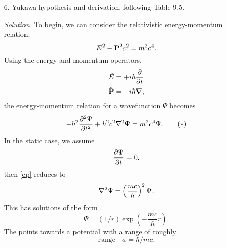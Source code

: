 \documentclass{homework}
\newcommand{\solution}{	\vspace{1em} \textit{Solution.} \quad }
\begin{document}
\begin{enumerate}
			\solution 
			$$
				\begin{array}{clcc}
					\toprule
					L & \text{State} & J & \text{Exchange Sym.} \\
					\midrule
					\multirow{2}{*}{$L=0$} & \ce{^1 S_0} & 0^+ & a \\
						& \ce{^3 S_1} & 1^+ & s \\
					\midrule
					\multirow{4}{*}{$L=1$} & \ce{^1 P_1} & 1^- & s \\
						& \ce{^3 P_0} & 0^- & a \\
						& \ce{^3 P_1} & 1^- & a \\
						& \ce{^3 P_2} & 2^- & a \\
					\midrule
					\multirow{4}{*}{$L=2$} & \ce{^1 D_2} & 2^+ & a \\
					& \ce{^3 D_3} & 3^+ & s  \\
					& \ce{^3 D_2} & 2^+ & s \\
					& \ce{^3 D_1} & 1^+ & s \\
					\midrule
					\multirow{4}{*}{$L=3$} & \ce{^1 F_3} & 3^- & s\\
					& \ce{^3 F_4} &  4^- & a\\
					& \ce{^3 F_3} & 3^- & a\\
					& \ce{^3 F_2} & 2^- & a\\
					\bottomrule
				\end{array}
			$$
			For a n-n and p-p system, only the antisymmetric ($a$) states area available due to the Pauli principle.
		\pagebreak
		
		\item[6.] Yukawa hypothesis and derivation, following Table 9.5.
			
			\solution To begin, we can consider the relativistic energy-momentum relation, $$E^2 - \boldsymbol{\mathrm{P}}^2 c^2 = m^2 c^4.$$
			Using the energy and momentum operators, \begin{align*}
				\hat{E} & = +i \hbar \pdv{t} \\
				\hat{\boldsymbol{\mathrm{P}}} & = - i \hbar \grad,
			\end{align*}
			the energy-momentum relation for a wavefunction $\Psi$ becomes \begin{equation*}
					-\hbar^2 \pdv[2]{\Psi}{t} + \hbar^2 c^2 \laplacian{\Psi} = m^2 c^4 \Psi. \label{ep} \tag{$*$} 
			\end{equation*}
			In the static case, we assume $$\pdv{\Psi}{t} = 0,$$
			then \eqref{ep} reduces to $$\laplacian{\Psi} = \left(\frac{mc}{\hbar}\right)^2 \Psi.$$
			This has solutions of the form $$\Psi = (1/r) \exp(-\frac{mc}{\hbar}r).$$
			The points towards a potential with a range of roughly $$\text{range} \quad a  = \hbar / m c.$$
	\end{enumerate}
\end{document}
